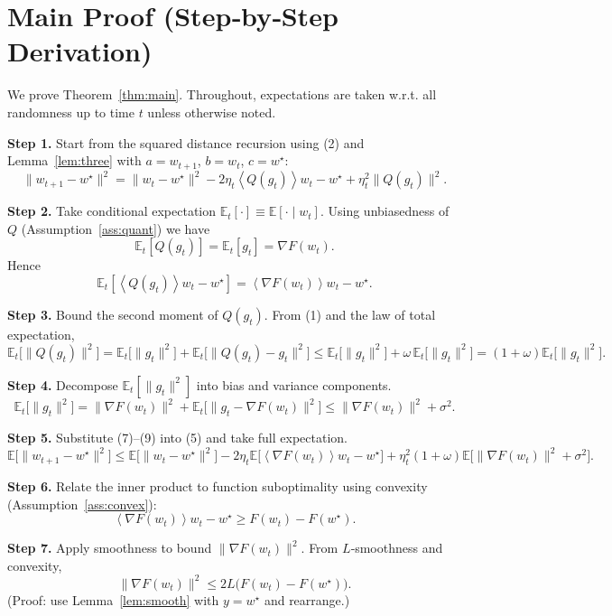 \documentclass{article}
\newcommand{\EE}{\mathbb{E}}
\newcommand{\inner}[1]{\left\langle #1 \right\rangle}
\begin{document}
\section*{Main Proof (Step‑by‑Step Derivation)}
We prove Theorem~\ref{thm:main}.  Throughout, expectations are taken w.r.t. all randomness up to time $t$ unless otherwise noted.

\noindent\textbf{Step 1.} Start from the squared distance recursion using (2) and Lemma~\ref{lem:three} with $a=w_{t+1}$, $b=w_t$, $c=w^{\star}$:
\[
\|w_{t+1}-w^{\star}\|^{2}
= \|w_t-w^{\star}\|^{2}
-2\eta_t\inner{Q(g_t)}{w_t-w^{\star}}
+\eta_t^{2}\|Q(g_t)\|^{2}. \tag{5}
\]

\noindent\textbf{Step 2.} Take conditional expectation $\EE_t[\cdot]\equiv\EE[\cdot\mid w_t]$.
Using unbiasedness of $Q$ (Assumption~\ref{ass:quant}) we have
\[
\EE_t[Q(g_t)]=\EE_t[g_t]=\nabla F(w_t). \tag{6}
\]
Hence
\[
\EE_t\!\left[\inner{Q(g_t)}{w_t-w^{\star}}\right]
= \inner{\nabla F(w_t)}{w_t-w^{\star}}. \tag{7}
\]

\noindent\textbf{Step 3.} Bound the second moment of $Q(g_t)$.  
From (1) and the law of total expectation,
\[
\EE_t\!\big[\|Q(g_t)\|^{2}\big]
= \EE_t\!\big[\|g_t\|^{2}\big] + \EE_t\!\big[\|Q(g_t)-g_t\|^{2}\big]
\le \EE_t\!\big[\|g_t\|^{2}\big] + \omega\,\EE_t\!\big[\|g_t\|^{2}\big]
= (1+\omega)\EE_t\!\big[\|g_t\|^{2}\big]. \tag{8}
\]

\noindent\textbf{Step 4.} Decompose $\EE_t[\|g_t\|^{2}]$ into bias and variance components.
\[
\EE_t\!\big[\|g_t\|^{2}\big]
= \|\nabla F(w_t)\|^{2} + \EE_t\!\big[\|g_t-\nabla F(w_t)\|^{2}\big]
\le \|\nabla F(w_t)\|^{2}+\sigma^{2}. \tag{9}
\]

\noindent\textbf{Step 5.} Substitute (7)–(9) into (5) and take full expectation.
\[
\EE\!\big[\|w_{t+1}-w^{\star}\|^{2}\big]
\le \EE\!\big[\|w_t-w^{\star}\|^{2}\big]
-2\eta_t\EE\!\big[\inner{\nabla F(w_t)}{w_t-w^{\star}}\big]
+\eta_t^{2}(1+\omega)\EE\!\big[\|\nabla F(w_t)\|^{2}+\sigma^{2}\big].
\tag{10}
\]

\noindent\textbf{Step 6.} Relate the inner product to function suboptimality using convexity (Assumption~\ref{ass:convex}):
\[
\inner{\nabla F(w_t)}{w_t-w^{\star}} \ge F(w_t)-F(w^{\star}). \tag{11}
\]

\noindent\textbf{Step 7.} Apply smoothness to bound $\|\nabla F(w_t)\|^{2}$.  
From $L$‑smoothness and convexity,
\[
\|\nabla F(w_t)\|^{2}\le 2L\big(F(w_t)-F(w^{\star})\big). \tag{12}
\]
(Proof: use Lemma~\ref{lem:smooth} with $y=w^{\star}$ and rearrange.)
\end{document}
